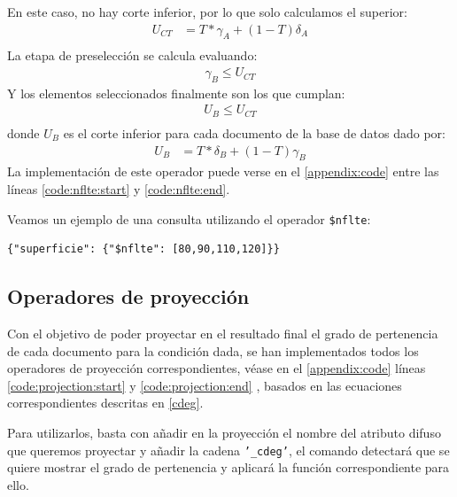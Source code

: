 En este caso, no hay corte inferior, por lo que solo calculamos el superior:
%
\begin{align*}
    U_{CT} &= T * \gamma_A + (1-T)\delta_A \\
\end{align*}
%
La etapa de preselección se calcula evaluando:
%
\begin{align*}
    \gamma_B \leq U_{CT}
\end{align*}
%
Y los elementos seleccionados finalmente son los que cumplan:
%
\begin{align*}
    U_B \leq U_{CT} \\
\end{align*}
%
donde $U_B$ es el corte inferior para cada documento de la base de datos dado por:
%
\begin{align*}
    U_B &= T * \delta_B + (1-T)\gamma_B
\end{align*}
%
La implementación de este operador puede verse en el \autoref{appendix:code} entre las líneas \ref{code:nflte:start} y \ref{code:nflte:end}.

\begin{example}
Veamos un ejemplo de una consulta utilizando el operador \texttt{\$nflte}:
%
\begin{verbatim}
{"superficie": {"$nflte": [80,90,110,120]}}
\end{verbatim}

\end{example}

\subsection{Operadores de proyección}

Con el objetivo de poder proyectar en el resultado final el grado de pertenencia de cada documento para la condición dada, se han implementados todos los operadores de proyección correspondientes, véase en el \autoref{appendix:code} líneas \ref{code:projection:start} y \ref{code:projection:end} , basados en las ecuaciones correspondientes descritas en \ref{cdeg}.

Para utilizarlos, basta con añadir en la proyección el nombre del atributo difuso que queremos proyectar y añadir la cadena \texttt{'\_cdeg'}, el comando detectará que se quiere mostrar el grado de pertenencia y aplicará la función correspondiente para ello.

